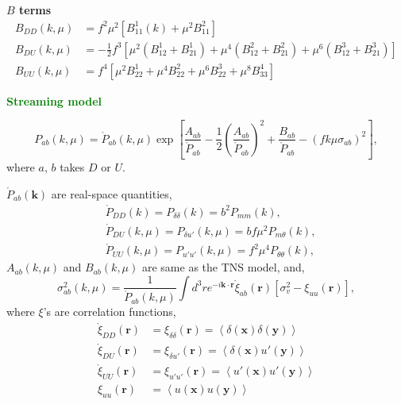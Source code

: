 \documentclass[a4paper,11pt, fleqn]{article}
\begin{document}
\textbf{$B$ terms}\vspace{-2mm}
\begin{align}
  B_{DD}(k, \mu) &= f^2 \mu^2 \left[ B^1_{11}(k) + \mu^2 B^2_{11} \right]\\
  B_{DU}(k, \mu) &= -\frac{1}{2} f^3 \left[
    \mu^2( B^1_{12} + B^1_{21} ) + \mu^4(B^2_{12} + B^2_{21})
    + \mu^6(B^3_{12} + B^3_{21}) \right]\\
  B_{UU}(k, \mu) &= f^4 \left[ \mu^2 B^1_{22} + \mu^4 B^2_{22} + \mu^6
    B^3_{22} + \mu^8 B^4_{33}\right]
\end{align}

%
%
\newpage
{\Huge \textbf{\textcolor{Green}{Streaming model}}}
\vspace{5mm}

\begin{equation}
  P_{ab}(k, \mu) = \mathring{P}_{ab}(k, \mu) \exp \left[
    \frac{A_{ab}}{\mathring{P}_{ab}}
    - \frac{1}{2} \left( \frac{A_{ab}}{\mathring{P}_{ab}} \right)^2
    + \frac{B_{ab}}{\mathring{P}_{ab}} - (f k \mu \sigma_{ab})^2
    \right],
\end{equation}
where $a$, $b$ takes $D$ or $U$.

$\mathring{P}_{ab}(\bm{k})$ are real-space quantities,
\begin{align}
  &\mathring{P}_{DD}(k) = P_{\delta\delta}(k) = b^2 P_{mm}(k),\\
  &\mathring{P}_{DU}(k, \mu) = P_{\delta u'}(k, \mu) = b f\mu^2 P_{m\theta}(k),\\
  &\mathring{P}_{UU}(k, \mu) = P_{u'u'}(k, \mu) = f^2\mu^4 P_{\theta\theta}(k),
\end{align}
$A_{ab}(k, \mu)$ and $B_{ab}(k, \mu)$ are same as the TNS model, and,
%
\begin{equation}
  \sigma_{ab}^2(k, \mu) = \frac{1}{\mathring{P}_{ab}(k, \mu)}
  \int \! d^3 r e^{-i\bm{k}\cdot\bm{r}} 
  \mathring{\xi}_{ab}(\bm{r}) \left[ \sigma^2_v - \xi_{uu}(\bm{r}) \right],
\end{equation}
%
where $\xi$'s are correlation functions,
%
\begin{align}
  \mathring{\xi}_{DD}(\bm{r}) &= \xi_{\delta\delta}(\bm{r}) = \left\langle
  \delta(\bm{x}) \delta(\bm{y}) \right\rangle\\
  \mathring{\xi}_{DU}(\bm{r}) &= \xi_{\delta u'}(\bm{r}) = \left\langle
  \delta(\bm{x}) u'(\bm{y}) \right\rangle\\
  \mathring{\xi}_{UU}(\bm{r}) &= \xi_{u'u'}(\bm{r}) = \left\langle
  u'(\bm{x}) u'(\bm{y}) \right\rangle\\
  \xi_{uu}(\bm{r}) &= \left\langle
  u(\bm{x}) u(\bm{y}) \right\rangle\\
\end{align}
  
\end{document}
